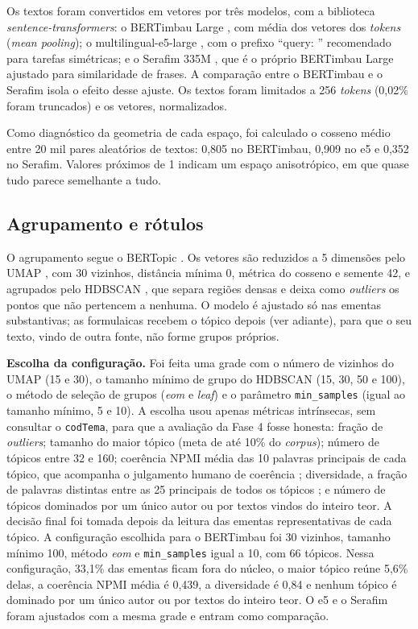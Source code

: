 Os textos foram convertidos em vetores por três modelos, com a biblioteca \textit{sentence-transformers}: o BERTimbau Large \citep{souza2020bertimbau}, com média dos vetores dos \textit{tokens} (\textit{mean pooling}); o multilingual-e5-large \citep{wang2024multilingual}, com o prefixo ``query: '' recomendado para tarefas simétricas; e o Serafim 335M \citep{gomes2024serafim}, que é o próprio BERTimbau Large ajustado para similaridade de frases. A comparação entre o BERTimbau e o Serafim isola o efeito desse ajuste. Os textos foram limitados a 256 \textit{tokens} (0,02\% foram truncados) e os vetores, normalizados.

Como diagnóstico da geometria de cada espaço, foi calculado o cosseno médio entre 20 mil pares aleatórios de textos: 0,805 no BERTimbau, 0,909 no e5 e 0,352 no Serafim. Valores próximos de 1 indicam um espaço anisotrópico, em que quase tudo parece semelhante a tudo.

\subsection{Agrupamento e rótulos}
\label{subsec:agrupamento}

O agrupamento segue o BERTopic \citep{grootendorst2022bertopic}. Os vetores são reduzidos a 5 dimensões pelo UMAP \citep{mcinnes2018umap}, com 30 vizinhos, distância mínima 0, métrica do cosseno e semente 42, e agrupados pelo HDBSCAN \citep{campello2013hdbscan}, que separa regiões densas e deixa como \textit{outliers} os pontos que não pertencem a nenhuma. O modelo é ajustado só nas ementas substantivas; as formulaicas recebem o tópico depois (ver adiante), para que o seu texto, vindo de outra fonte, não forme grupos próprios.

\textbf{Escolha da configuração.} Foi feita uma grade com o número de vizinhos do UMAP (15 e 30), o tamanho mínimo de grupo do HDBSCAN (15, 30, 50 e 100), o método de seleção de grupos (\textit{eom} e \textit{leaf}) e o parâmetro \texttt{min\_samples} (igual ao tamanho mínimo, 5 e 10). A escolha usou apenas métricas intrínsecas, sem consultar o \texttt{codTema}, para que a avaliação da Fase 4 fosse honesta: fração de \textit{outliers}; tamanho do maior tópico (meta de até 10\% do \textit{corpus}); número de tópicos entre 32 e 160; coerência NPMI média das 10 palavras principais de cada tópico, que acompanha o julgamento humano de coerência \citep{lau2014machine}; diversidade, a fração de palavras distintas entre as 25 principais de todos os tópicos \citep{dieng2020topic}; e número de tópicos dominados por um único autor ou por textos vindos do inteiro teor. A decisão final foi tomada depois da leitura das ementas representativas de cada tópico. A configuração escolhida para o BERTimbau foi 30 vizinhos, tamanho mínimo 100, método \textit{eom} e \texttt{min\_samples} igual a 10, com 66 tópicos. Nessa configuração, 33,1\% das ementas ficam fora do núcleo, o maior tópico reúne 5,6\% delas, a coerência NPMI média é 0,439, a diversidade é 0,84 e nenhum tópico é dominado por um único autor ou por textos do inteiro teor. O e5 e o Serafim foram ajustados com a mesma grade e entram como comparação.

